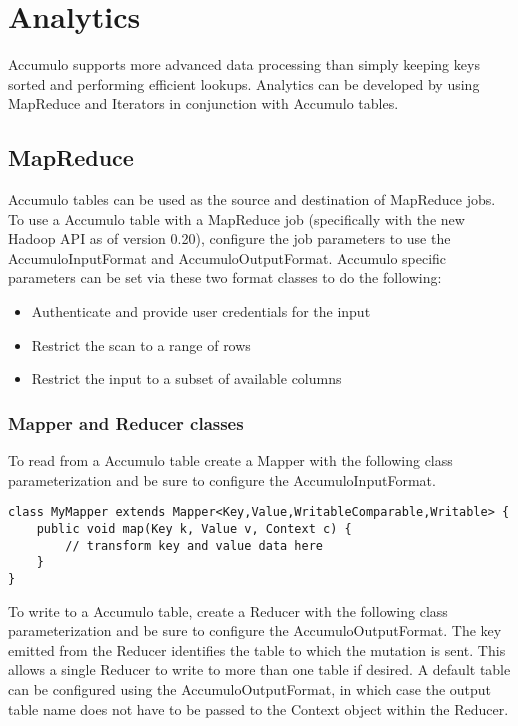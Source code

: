 \chapter{Analytics}

Accumulo supports more advanced data processing than simply keeping keys
sorted and performing efficient lookups. Analytics can be developed by using
MapReduce and Iterators in conjunction with Accumulo tables.

\section{MapReduce}

Accumulo tables can be used as the source and destination of MapReduce jobs. To
use a Accumulo table with a MapReduce job (specifically with the new Hadoop API
as of version 0.20), configure the job parameters to use the AccumuloInputFormat
and AccumuloOutputFormat. Accumulo specific parameters can be set via these
two format classes to do the following:
\begin{itemize}
\item{Authenticate and provide user credentials for the input}
\item{Restrict the scan to a range of rows}
\item{Restrict the input to a subset of available columns}
\end{itemize}

\subsection{Mapper and Reducer classes}

To read from a Accumulo table create a Mapper with the following class
parameterization and be sure to configure the AccumuloInputFormat.

\small
\begin{verbatim}
class MyMapper extends Mapper<Key,Value,WritableComparable,Writable> {
    public void map(Key k, Value v, Context c) {
        // transform key and value data here
    }
}
\end{verbatim}
\normalsize

To write to a Accumulo table, create a Reducer with the following class
parameterization and be sure to configure the AccumuloOutputFormat. The key
emitted from the Reducer identifies the table to which the mutation is sent. This
allows a single Reducer to write to more than one table if desired. A default table
can be configured using the AccumuloOutputFormat, in which case the output table
name does not have to be passed to the Context object within the Reducer.

